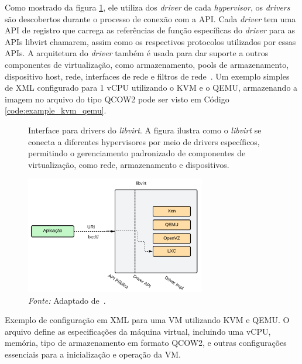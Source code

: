 Como mostrado da figura \ref*{fig:libvirt_interface}, ele utiliza dos \textit{driver} de cada \textit{hypervisor}, os \textit{drivers} são descobertos durante o processo de conexão com a API. Cada \textit{driver} tem uma API de registro que carrega as referências de função específicas do \textit{driver} para as APIs libvirt chamarem, assim como os respectivos protocolos utilizados por essas APIs. A arquitetura do \textit{driver} também é usada para dar suporte a outros componentes de virtualização, como armazenamento, pools de armazenamento, dispositivo host, rede, interfaces de rede e filtros de rede~\citep{LibvirtDocumentation}. Um exemplo simples de XML configurado para 1 vCPU utilizando o KVM e o QEMU, armazenando a imagem no arquivo do tipo QCOW2 pode ser visto em Código \ref{code:example_kvm_qemu}.


\begin{figure}[htbp]
  \centering
  \caption{Interface para drivers do \textit{libvirt}. A figura ilustra como o \textit{libvirt} se conecta a diferentes hypervisores por meio de drivers específicos, permitindo o gerenciamento padronizado de componentes de virtualização, como rede, armazenamento e dispositivos.}
  \includegraphics[width=0.7\textwidth]{images/libvirt_interface.png}
  \caption*{\textit{Fonte:} Adaptado de~\citep{LibvirtDocumentation}.}
  \label{fig:libvirt_interface}
\end{figure}

\begin{listing}[h!]
  \noindent{}  
\caption{Exemplo de configuração em XML para uma VM utilizando KVM e QEMU. O arquivo define as especificações da máquina virtual, incluindo uma vCPU, memória, tipo de armazenamento em formato QCOW2, e outras configurações essenciais para a inicialização e operação da VM.}
\label{code:example_kvm_qemu}
\end{listing}


